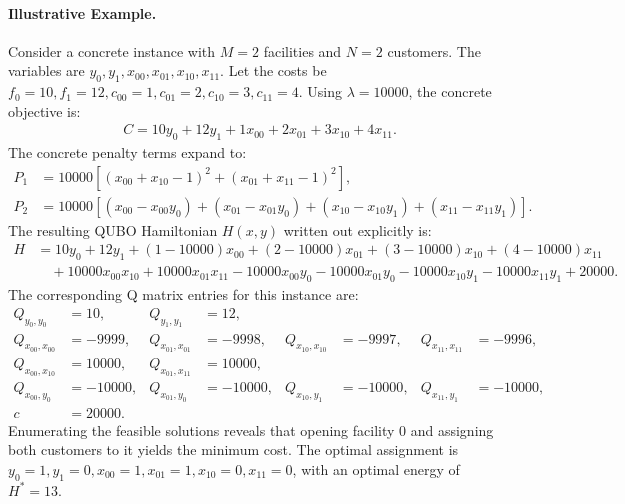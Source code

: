 \documentclass[12pt]{article}
\begin{document}
\paragraph{Illustrative Example.}
Consider a concrete instance with $M=2$ facilities and $N=2$ customers. The variables are $y_0, y_1, x_{00}, x_{01}, x_{10}, x_{11}$. Let the costs be $f_0=10, f_1=12, c_{00}=1, c_{01}=2, c_{10}=3, c_{11}=4$. Using $\lambda=10000$, the concrete objective is:
\begin{align}
C = 10y_0 + 12y_1 + 1x_{00} + 2x_{01} + 3x_{10} + 4x_{11}.
\end{align}
The concrete penalty terms expand to:
\begin{align}
P_1 &= 10000\left[(x_{00}+x_{10}-1)^2 + (x_{01}+x_{11}-1)^2\right], \\
P_2 &= 10000\left[(x_{00}-x_{00}y_0) + (x_{01}-x_{01}y_0) + (x_{10}-x_{10}y_1) + (x_{11}-x_{11}y_1)\right].
\end{align}
The resulting QUBO Hamiltonian $H(x,y)$ written out explicitly is:
\begin{align}
H &= 10y_0 + 12y_1 + (1-10000)x_{00} + (2-10000)x_{01} + (3-10000)x_{10} + (4-10000)x_{11} \nonumber \\
&\quad + 10000x_{00}x_{10} + 10000x_{01}x_{11} - 10000x_{00}y_0 - 10000x_{01}y_0 - 10000x_{10}y_1 - 10000x_{11}y_1 + 20000.
\end{align}
The corresponding Q matrix entries for this instance are:
\begin{align}
Q_{y_0,y_0} &= 10, & Q_{y_1,y_1} &= 12, \nonumber \\
Q_{x_{00},x_{00}} &= -9999, & Q_{x_{01},x_{01}} &= -9998, & Q_{x_{10},x_{10}} &= -9997, & Q_{x_{11},x_{11}} &= -9996, \nonumber \\
Q_{x_{00},x_{10}} &= 10000, & Q_{x_{01},x_{11}} &= 10000, \nonumber \\
Q_{x_{00},y_0} &= -10000, & Q_{x_{01},y_0} &= -10000, & Q_{x_{10},y_1} &= -10000, & Q_{x_{11},y_1} &= -10000, \nonumber \\
c &= 20000.
\end{align}
Enumerating the feasible solutions reveals that opening facility $0$ and assigning both customers to it yields the minimum cost. The optimal assignment is $y_0=1, y_1=0, x_{00}=1, x_{01}=1, x_{10}=0, x_{11}=0$, with an optimal energy of $H^* = 13$.
\end{document}
